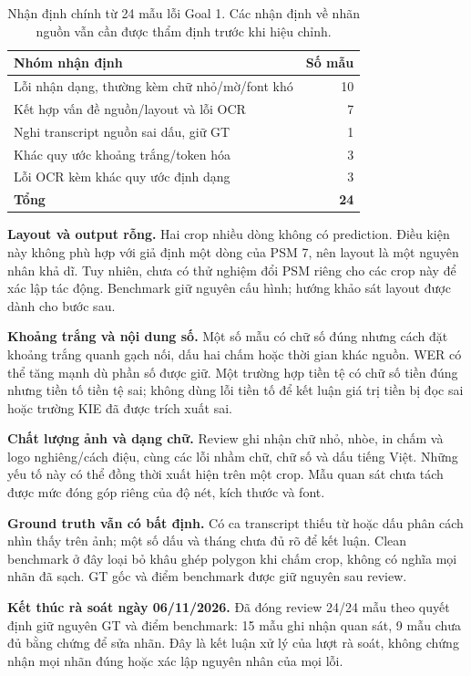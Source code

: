 \documentclass[11pt,a4paper]{article}
\newcommand{\note}[1]{\par\begingroup\setlength{\fboxsep}{9pt}\noindent\colorbox{pale}{\parbox{\dimexpr\linewidth-18pt\relax}{#1}}\endgroup\par}
\begin{document}
\begin{table}[H]
\caption{Nhận định chính từ 24 mẫu lỗi Goal 1. Các nhận định về nhãn nguồn vẫn cần được thẩm định trước khi hiệu chỉnh.}
\begin{tabularx}{\linewidth}{@{}Yr@{}}
\toprule
\textbf{Nhóm nhận định} & \textbf{Số mẫu}\\\midrule
Lỗi nhận dạng, thường kèm chữ nhỏ/mờ/font khó & 10\\
Kết hợp vấn đề nguồn/layout và lỗi OCR & 7\\
Nghi transcript nguồn sai dấu, giữ GT & 1\\
Khác quy ước khoảng trắng/token hóa & 3\\
Lỗi OCR kèm khác quy ước định dạng & 3\\\midrule
\textbf{Tổng} & \textbf{24}\\
\bottomrule
\end{tabularx}
\end{table}

\textbf{Layout và output rỗng.} Hai crop nhiều dòng không có prediction. Điều kiện này không phù hợp với giả định một dòng của PSM 7, nên layout là một nguyên nhân khả dĩ. Tuy nhiên, chưa có thử nghiệm đổi PSM riêng cho các crop này để xác lập tác động. Benchmark giữ nguyên cấu hình; hướng khảo sát layout được dành cho bước sau.

\textbf{Khoảng trắng và nội dung số.} Một số mẫu có chữ số đúng nhưng cách đặt khoảng trắng quanh gạch nối, dấu hai chấm hoặc thời gian khác nguồn. WER có thể tăng mạnh dù phần số được giữ. Một trường hợp tiền tệ có chữ số tiền đúng nhưng tiền tố tiền tệ sai; không dùng lỗi tiền tố để kết luận giá trị tiền bị đọc sai hoặc trường KIE đã được trích xuất sai.

\textbf{Chất lượng ảnh và dạng chữ.} Review ghi nhận chữ nhỏ, nhòe, in chấm và logo nghiêng/cách điệu, cùng các lỗi nhầm chữ, chữ số và dấu tiếng Việt. Những yếu tố này có thể đồng thời xuất hiện trên một crop. Mẫu quan sát chưa tách được mức đóng góp riêng của độ nét, kích thước và font.

\textbf{Ground truth vẫn có bất định.} Có ca transcript thiếu từ hoặc dấu phân cách nhìn thấy trên ảnh; một số dấu và tháng chưa đủ rõ để kết luận. Clean benchmark ở đây loại bỏ khâu ghép polygon khi chấm crop, không có nghĩa mọi nhãn đã sạch. GT gốc và điểm benchmark được giữ nguyên sau review.

\note{\textbf{Kết thúc rà soát ngày 06/11/2026.} Đã đóng review 24/24 mẫu theo quyết định giữ nguyên GT và điểm benchmark: 15 mẫu ghi nhận quan sát, 9 mẫu chưa đủ bằng chứng để sửa nhãn. Đây là kết luận xử lý của lượt rà soát, không chứng nhận mọi nhãn đúng hoặc xác lập nguyên nhân của mọi lỗi.}
\end{document}

